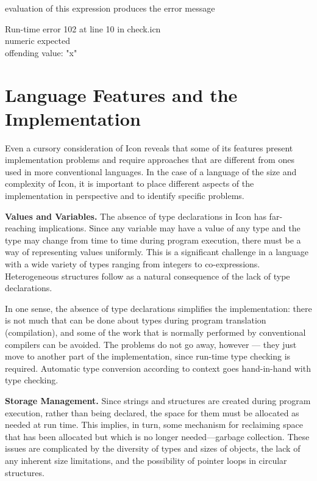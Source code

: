 
\noindent
evaluation of this expression produces the error message

\begin{iconcode}
\>Run-time error 102 at line 10 in check.icn\\
\>numeric expected\\
\>offending value: "x"
\end{iconcode}

\section{Language Features and the Implementation}

Even a cursory consideration of Icon reveals that some of its features
present implementation problems and require approaches that are
different from ones used in more conventional languages. In the case
of a language of the size and complexity of Icon, it is important to
place different aspects of the implementation in perspective and to
identify specific problems.


\textbf{Values and Variables.} The absence of type declarations in
Icon has far-reaching implications. Since any variable may have a
value of any type and the type may change from time to time during
program execution, there must be a way of representing values
uniformly. This is a significant challenge in a language with a wide
variety of types ranging from integers to
co-expressions. Heterogeneous structures follow as a natural
consequence of the lack of type declarations.

In one sense, the absence of type declarations simplifies the
implementation: there is not much that can be done about types during
program translation (compilation), and some of the work that is
normally performed by conventional compilers can be avoided. The
problems do not go away, however --- they just move to another part of
the implementation, since run-time type checking is
required. Automatic type conversion according to context goes
hand-in-hand with type checking.


\textbf{Storage Management.} Since strings and structures are created
during program execution, rather than being declared, the space for
them must be allocated as needed at run time. This implies, in turn,
some mechanism for reclaiming space that has been allocated but which
is no longer needed{---}{\textquotedbl}garbage collection.{\textquotedbl}
These issues are complicated by the diversity of types and sizes of
objects, the lack of any inherent size limitations, and the
possibility of pointer loops in circular structures.


